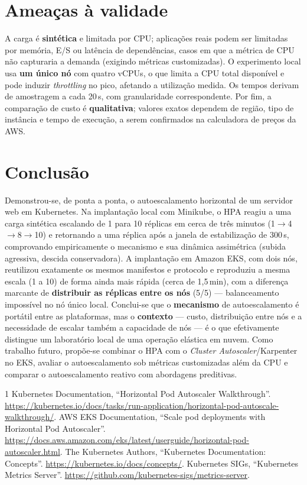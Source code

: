 \documentclass[conference]{IEEEtran}
\begin{document}
\section{Ameaças à validade}\label{sec:ameacas}
A carga é \textbf{sintética} e limitada por CPU; aplicações reais podem ser limitadas por memória,
E/S ou latência de dependências, casos em que a métrica de CPU não capturaria a demanda (exigindo
métricas customizadas). O experimento local usa \textbf{um único nó} com quatro vCPUs, o que limita
a CPU total disponível e pode induzir \textit{throttling} no pico, afetando a utilização medida. Os
tempos derivam de amostragem a cada 20\,s, com granularidade correspondente. Por fim, a comparação
de custo é \textbf{qualitativa}; valores exatos dependem de região, tipo de instância e tempo de
execução, a serem confirmados na calculadora de preços da AWS.

\section{Conclusão}\label{sec:conc}
Demonstrou-se, de ponta a ponta, o autoescalamento horizontal de um servidor web em Kubernetes. Na
implantação local com Minikube, o HPA reagiu a uma carga sintética escalando de 1 para 10 réplicas
em cerca de três minutos (1$\to$4$\to$8$\to$10) e retornando a uma réplica após a janela de
estabilização de 300\,s, comprovando empiricamente o mecanismo e sua dinâmica assimétrica (subida
agressiva, descida conservadora). A implantação em Amazon EKS, com dois nós, reutilizou
exatamente os mesmos manifestos e protocolo e reproduziu a mesma escala (1 a 10) de forma ainda
mais rápida (cerca de 1,5\,min), com a diferença marcante de \textbf{distribuir as réplicas entre
os nós} (5/5) --- balanceamento impossível no nó único local.
Conclui-se que o \textbf{mecanismo} de autoescalamento é portátil entre as plataformas, mas o
\textbf{contexto} --- custo, distribuição entre nós e a necessidade de escalar também a capacidade
de nós --- é o que efetivamente distingue um laboratório local de uma operação elástica em nuvem.
Como trabalho futuro, propõe-se combinar o HPA com o \textit{Cluster Autoscaler}/Karpenter no EKS,
avaliar o autoescalamento sob métricas customizadas além da CPU e comparar o autoescalamento
reativo com abordagens preditivas.

\begin{thebibliography}{1}
Kubernetes Documentation, ``Horizontal Pod Autoscaler Walkthrough''.
\url{https://kubernetes.io/docs/tasks/run-application/horizontal-pod-autoscale-walkthrough/}.
AWS EKS Documentation, ``Scale pod deployments with Horizontal Pod Autoscaler''.
\url{https://docs.aws.amazon.com/eks/latest/userguide/horizontal-pod-autoscaler.html}.
The Kubernetes Authors, ``Kubernetes Documentation: Concepts''.
\url{https://kubernetes.io/docs/concepts/}.
Kubernetes SIGs, ``Kubernetes Metrics Server''.
\url{https://github.com/kubernetes-sigs/metrics-server}.
\end{thebibliography}
\end{document}

